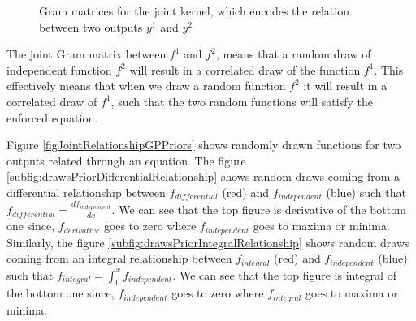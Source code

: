 \begin{figure}[!ht]
  \centering
  \quad
  \caption{Gram matrices for the joint kernel, which encodes the relation between two outputs $y^1$ and $y^2$}
  \label{figGramMatricesJointKernel}
\end{figure}

The joint Gram matrix between \(f^{1}\) and \(f^{2}\), means that a random draw of independent function \(f^{2}\) will result in a correlated draw of the function \(f^{1}\). This effectively means that when we draw a random function \(f^{2}\) it will result in a correlated draw of \(f^{1}\), such that the two random functions will satisfy the enforced equation. 

Figure \ref{figJointRelationshipGPPriors} shows randomly drawn functions for two outputs related through an equation. The figure  \ref{subfig:drawsPriorDifferentialRelationship} shows random draws coming from a differential relationship between \(f_{differential}\) (red) and \(f_{independent}\) (blue) such that \(f_{differential} = \frac{d f_{independent}}{d x}\). We can see that the top figure is derivative of the bottom one since, \(f_{derivative}\) goes to zero where \(f_{independent}\) goes to maxima or minima. Similarly, the figure \ref{subfig:drawsPriorIntegralRelationship} shows random draws coming from an integral relationship between \(f_{integral}\) (red) and \(f_{independent}\) (blue) such that \(f_{integral} = \int_{0}^x f_{independent}\). We can see that the top figure is integral of the bottom one since, \(f_{independent}\) goes to zero where \(f_{integral}\) goes to maxima or minima. 

